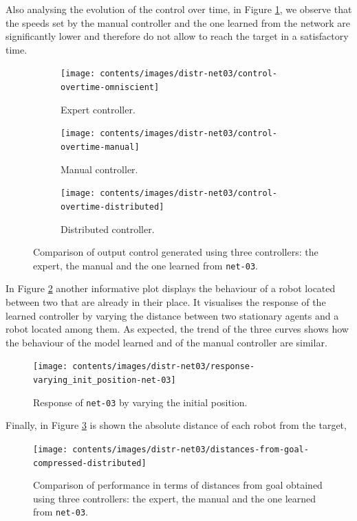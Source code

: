 Also analysing the evolution of the control over time, in Figure 
\ref{fig:net03control}, we observe that the speeds set by the manual 
controller and the one learned from the network are significantly lower and 
therefore do not allow to reach the target in a satisfactory time.
\begin{figure}[!htb]
	\centering
	\begin{subfigure}[h]{0.3\textwidth}
		\centering
		\texttt{[image: contents/images/distr-net03/control-overtime-omniscient]}%
		\caption{Expert controller.}
	\end{subfigure}
	\hfill
	\begin{subfigure}[h]{0.3\textwidth}
		\centering
		\texttt{[image: contents/images/distr-net03/control-overtime-manual]}%
		\caption{Manual controller.}
	\end{subfigure}
	\hfill
	\begin{subfigure}[h]{0.3\textwidth}
		\centering
		\texttt{[image: contents/images/distr-net03/control-overtime-distributed]}
		\caption{Distributed controller.}
	\end{subfigure}
	\caption[Evaluation of the control learned by \texttt{net-03}.]{Comparison 
		of output control generated using three controllers: the expert, the 
		manual 
		and the one learned from \texttt{net-03}.}
	\label{fig:net03control}
\end{figure}

In Figure \ref{fig:net03responseposition} another informative plot displays 
the behaviour of a robot located between two that are already in their place.
It visualises the response of the learned controller by varying the distance 
between two stationary agents and a robot located among them.
As expected, the trend of the three curves shows how the behaviour of the 
model learned and of the manual controller are similar.
\begin{figure}[!htb]
	\centering
	\texttt{[image: contents/images/distr-net03/response-varying\_init\_position-net-03]}%
	\caption{Response of \texttt{net-03} by varying the initial position.}
	\label{fig:net03responseposition}
\end{figure}

Finally, in Figure \ref{fig:net03distance} is shown the absolute distance of 
each robot from the target,
\begin{figure}[!htb]
	\centering
	\texttt{[image: contents/images/distr-net03/distances-from-goal-compressed-distributed]}%
	\caption[Evaluation of \texttt{net1} distances from goal.]{Comparison of 
		performance in terms of distances from goal obtained using three 
		controllers: 
		the expert, the manual and the one learned from \texttt{net-03}.}
	\label{fig:net03distance}
\end{figure}

